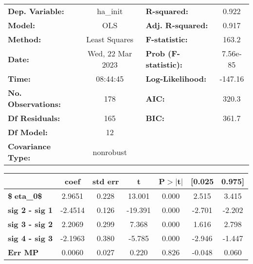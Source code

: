 \begin{center}
\begin{tabular}{lclc}
\toprule
\textbf{Dep. Variable:}    &     ha\_init     & \textbf{  R-squared:         } &    0.922  \\
\textbf{Model:}            &       OLS        & \textbf{  Adj. R-squared:    } &    0.917  \\
\textbf{Method:}           &  Least Squares   & \textbf{  F-statistic:       } &    163.2  \\
\textbf{Date:}             & Wed, 22 Mar 2023 & \textbf{  Prob (F-statistic):} & 7.56e-85  \\
\textbf{Time:}             &     08:44:45     & \textbf{  Log-Likelihood:    } &  -147.16  \\
\textbf{No. Observations:} &         178      & \textbf{  AIC:               } &    320.3  \\
\textbf{Df Residuals:}     &         165      & \textbf{  BIC:               } &    361.7  \\
\textbf{Df Model:}         &          12      & \textbf{                     } &           \\
\textbf{Covariance Type:}  &    nonrobust     & \textbf{                     } &           \\
\bottomrule
\end{tabular}
\end{center}\begin{center}
\begin{tabular}{lcccccc}
\toprule
                                & \textbf{coef} & \textbf{std err} & \textbf{t} & \textbf{P$> |$t$|$} & \textbf{[0.025} & \textbf{0.975]}  \\
\midrule
\textbf{\$eta\_{0}\$}          &       2.9651  &        0.228     &    13.001  &         0.000        &        2.515    &        3.415     \\
\textbf{sig 2 - sig 1}          &      -2.4514  &        0.126     &   -19.391  &         0.000        &       -2.701    &       -2.202     \\
\textbf{sig 3 - sig 2}          &       2.2069  &        0.299     &     7.368  &         0.000        &        1.616    &        2.798     \\
\textbf{sig 4 - sig 3}          &      -2.1963  &        0.380     &    -5.785  &         0.000        &       -2.946    &       -1.447     \\
\textbf{Err MP}                 &       0.0060  &        0.027     &     0.220  &         0.826        &       -0.048    &        0.060     \\

\end{tabular}
\end{center}
